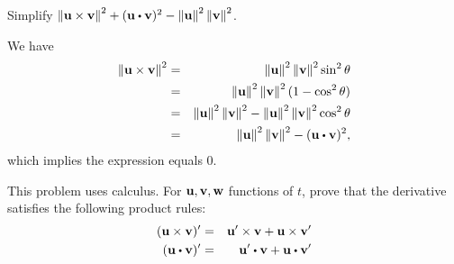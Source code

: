 \begin{ex}
  Simplify
  $\norm{\vect{u}\times \vect{v}}^2+(\vect{u}\dotprod
    \vect{v})^2-\norm{\vect{u}}^2\norm{ \vect{v}}^2$.
  \begin{sol}
    We have
    \begin{eqnarray*}
      \norm{\vect{u}\times \vect{v}}^2
      &=&\norm{\vect{u}
          }^2\norm{\vect{v}}^2\sin^2\theta \\
      &=&\norm{\vect{u}}^2\norm{\vect{v}}^2(1-\cos^2\theta) \\
      &=&\norm{\vect{u}}^2\norm{\vect{v}}^2
          -\norm{\vect{u}}^2\norm{\vect{v}}^2\cos^2\theta \\
      &=&\norm{\vect{u}}^2\norm{\vect{v}}^2
          -(\vect{u}\dotprod \vect{v})^2,
    \end{eqnarray*}
    which implies the expression equals $0$.
  \end{sol}
\end{ex}

\begin{ex}
  This problem uses calculus. For $\vect{u},\vect{v},\vect{w}$
  functions of $t$, prove that the derivative satisfies the following
  product rules:
  \begin{eqnarray*}
    (\vect{u}\times \vect{v})^{\prime }
    &=&\vect{u}^{\prime }\times
        \vect{v}+\vect{u}\times \vect{v}^{\prime } \\
    (\vect{u}\dotprod \vect{v})^{\prime }
    &=&\vect{u}^{\prime }\dotprod
        \vect{v}+\vect{u}\dotprod \vect{v}^{\prime }
  \end{eqnarray*}
\end{ex}

